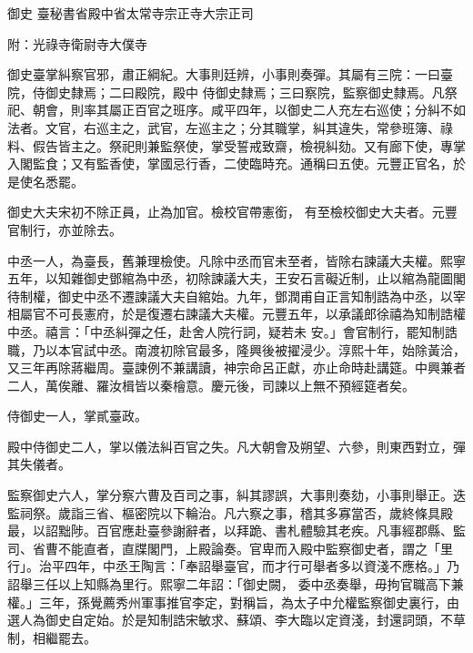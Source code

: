 
\begin{pinyinscope}

 御史
 臺秘書省殿中省太常寺宗正寺大宗正司



 附：光祿寺衛尉寺大僕寺



 御史臺掌糾察官邪，肅正綱紀。大事則廷辨，小事則奏彈。其屬有三院：一曰臺院，侍御史隸焉；二曰殿院，殿中
 侍御史隸焉；三曰察院，監察御史隸焉。凡祭祀、朝會，則率其屬正百官之班序。咸平四年，以御史二人充左右巡使；分糾不如法者。文官，右巡主之，武官，左巡主之；分其職掌，糾其違失，常參班簿、祿料、假告皆主之。祭祀則兼監祭使，掌受誓戒致齋，檢視糾劾。又有廊下使，專掌入閣監食；又有監香使，掌國忌行香，二使臨時充。通稱曰五使。元豐正官名，於是使名悉罷。



 御史大夫宋初不除正員，止為加官。檢校官帶憲銜，
 有至檢校御史大夫者。元豐官制行，亦並除去。



 中丞一人，為臺長，舊兼理檢使。凡除中丞而官未至者，皆除右諫議大夫權。熙寧五年，以知雜御史鄧綰為中丞，初除諫議大夫，王安石言礙近制，止以綰為龍圖閣待制權，御史中丞不遷諫議大夫自綰始。九年，鄧潤甫自正言知制誥為中丞，以宰相屬官不可長憲府，於是復遷右諫議大夫權。元豐五年，以承議郎徐禧為知制誥權中丞。禧言：「中丞糾彈之任，赴舍人院行詞，疑若未
 安。」會官制行，罷知制誥職，乃以本官試中丞。南渡初除官最多，隆興後被擢浸少。淳熙十年，始除黃洽，又三年再除蔣繼周。臺諫例不兼講讀，神宗命呂正獻，亦止命時赴講筵。中興兼者二人，萬俟離、羅汝楫皆以秦檜意。慶元後，司諫以上無不預經筵者矣。



 侍御史一人，掌貳臺政。



 殿中侍御史二人，掌以儀法糾百官之失。凡大朝會及朔望、六參，則東西對立，彈其失儀者。



 監察御史六人，掌分察六曹及百司之事，糾其謬誤，大事則奏劾，小事則舉正。迭監祠祭。歲詣三省、樞密院以下輪治。凡六察之事，稽其多寡當否，歲終條具殿最，以詔黜陟。百官應赴臺參謝辭者，以拜跪、書札體驗其老疾。凡事經郡縣、監司、省曹不能直者，直牒閣門，上殿論奏。官卑而入殿中監察御史者，謂之「里行」。治平四年，中丞王陶言：「奉詔舉臺官，而才行可舉者多以資淺不應格。」乃詔舉三任以上知縣為里行。熙寧二年詔：「御史闕，
 委中丞奏舉，毋拘官職高下兼權。」三年，孫覺薦秀州軍事推官李定，對稱旨，為太子中允權監察御史裏行，由選人為御史自定始。於是知制誥宋敏求、蘇頌、李大臨以定資淺，封還詞頭，不草制，相繼罷去。




\end{pinyinscope}
